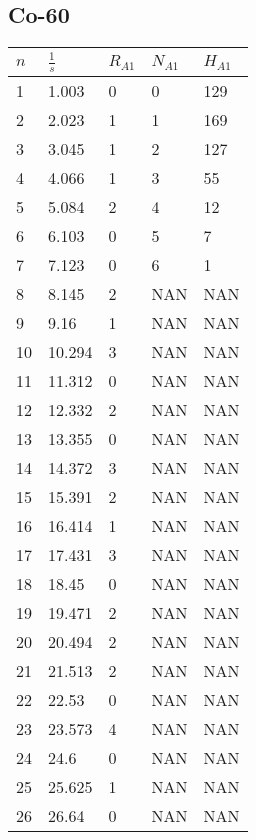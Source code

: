 \documentclass{article}
\begin{document}
		\subsection*{Co-60}
			\begin{longtable}{@{}lllll@{}}
				\toprule
				$n$   & $\frac{1}{s}$     & $R_{A1}$ & $N_{A1}$ & $H_{A1}$ \\* \midrule
				\endfirsthead
				\endhead
				\bottomrule
				\endfoot
				\endlastfoot
				1   & 1.003   & 0    & 0    & 129  \\
				2   & 2.023   & 1    & 1    & 169  \\
				3   & 3.045   & 1    & 2    & 127  \\
				4   & 4.066   & 1    & 3    & 55   \\
				5   & 5.084   & 2    & 4    & 12   \\
				6   & 6.103   & 0    & 5    & 7    \\
				7   & 7.123   & 0    & 6    & 1    \\
				8   & 8.145   & 2    & NAN  & NAN  \\
				9   & 9.16    & 1    & NAN  & NAN  \\
				10  & 10.294  & 3    & NAN  & NAN  \\
				11  & 11.312  & 0    & NAN  & NAN  \\
				12  & 12.332  & 2    & NAN  & NAN  \\
				13  & 13.355  & 0    & NAN  & NAN  \\
				14  & 14.372  & 3    & NAN  & NAN  \\
				15  & 15.391  & 2    & NAN  & NAN  \\
				16  & 16.414  & 1    & NAN  & NAN  \\
				17  & 17.431  & 3    & NAN  & NAN  \\
				18  & 18.45   & 0    & NAN  & NAN  \\
				19  & 19.471  & 2    & NAN  & NAN  \\
				20  & 20.494  & 2    & NAN  & NAN  \\
				21  & 21.513  & 2    & NAN  & NAN  \\
				22  & 22.53   & 0    & NAN  & NAN  \\
				23  & 23.573  & 4    & NAN  & NAN  \\
				24  & 24.6    & 0    & NAN  & NAN  \\
				25  & 25.625  & 1    & NAN  & NAN  \\
				26  & 26.64   & 0    & NAN  & NAN  \\

\end{longtable}
\end{document}
